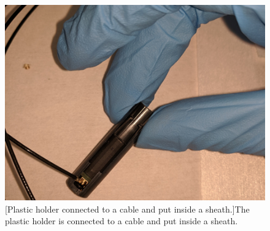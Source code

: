 \begin{figure}[!h]
\begin{minipage}{.45\textwidth}
  \includegraphics[width=\linewidth]{Chapter3/Figs/Raster/detCon023b_HoldersConnectedZoom.png} 
  [Plastic holder connected to a cable and put inside a sheath.]{The plastic holder is connected to a cable and put inside a sheath.}
  \label{fig:detCon023b_HoldersConnectedZoom}
  \vspace{1.912cm} %
\end{minipage}
\end{figure}


